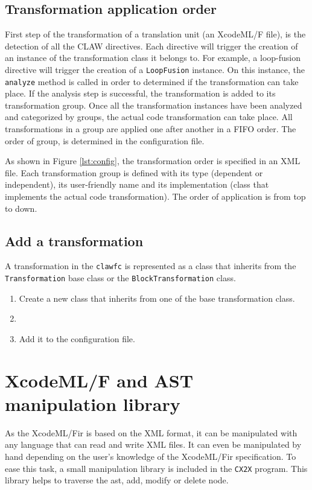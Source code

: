 \documentclass[a4paper, 11pt]{report}
\def\xcodeml{XcodeML/F\xspace}
\def\clawfc{\lstinline!clawfc!\xspace}
\def\cx2x{\lstinline!CX2X!\xspace}
\begin{document}


\section{Transformation application order}
First step of the transformation of a translation unit (an XcodeML/F file), is the detection of all the CLAW directives. Each directive will trigger the creation of an instance of the transformation class it belongs to. For example, a loop-fusion directive will trigger the creation of a \lstinline|LoopFusion| instance. On this instance, the \lstinline|analyze| method is called in order to determined if the transformation can take place. If the analysis step is successful, the transformation is added to its transformation group. 
Once all the transformation instances have been analyzed and categorized by groups, the actual code transformation can take place. All transformations in a group are applied one after another in a FIFO order. The order of group, is determined in the configuration file. 



As shown in Figure \ref{lst:config}, the transformation order is specified in an XML file. Each transformation group is defined with its type (dependent or independent), its user-friendly name and its implementation (class that implements the actual code transformation). The order of application is from top to down.


\section{Add a transformation}
A transformation in the \clawfc is represented as a class that inherits from the \lstinline|Transformation| base class or the \lstinline|BlockTransformation| class.

\begin{enumerate}
\item Create a new class that inherits from one of the base transformation class.
\item %
\item Add it to the configuration file.
\end{enumerate}

\chapter{\xcodeml and AST manipulation library}
\label{chapter:astmanip}
As the \xcodeml \gls{ir} is based on the XML format, it can be manipulated with any language that can read and write XML files. It can even be manipulated by hand depending on the user's knowledge of the \xcodeml \gls{ir} specification. 
To ease this task, a small manipulation library is included in the \cx2x program. This library helps to traverse the \gls{ast}, add, modify or delete node.
\end{document}
